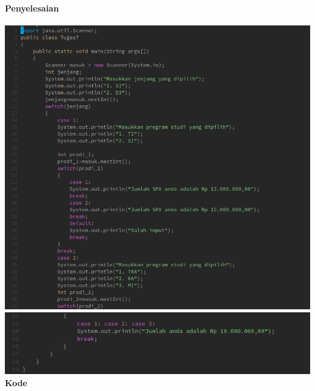 \documentclass[a4paper,12pt]{article}
\begin{document}
\paragraph{Penyelesaian\\}
\includegraphics[width=\linewidth]{tugas-1}\\
\includegraphics[width=\linewidth]{tugas-2}\\
{\bfseries Kode}
\end{document}
